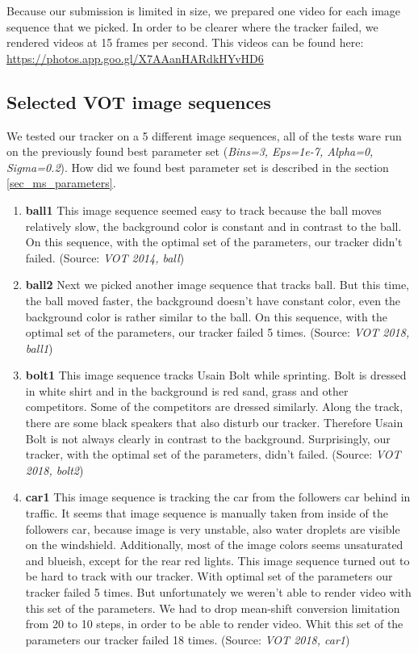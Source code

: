\documentclass[runningheads]{llncs}
\begin{document}
Because our submission is limited in size, we prepared one video for each image sequence that we picked. In order to be clearer where the tracker failed, we rendered videos at 15 frames per second. This videos can be found here: \url{https://photos.app.goo.gl/X7AAanHARdkHYvHD6}

\subsection{Selected VOT image sequences}

We tested our tracker on a 5 different image sequences, all of the tests ware run on the previously found best parameter set (\textit{Bins=3, Eps=1e-7, Alpha=0, Sigma=0.2}). How did we found best parameter set is described in the section \ref{sec_ms_parameters}.
\begin{enumerate}
\item \textbf{ball1} This image sequence seemed easy to track because the ball moves relatively slow, the background color is constant and in contrast to the ball. On this sequence, with the optimal set of the parameters, our tracker didn't failed. (Source: \textit{VOT 2014, ball})
\item \textbf{ball2} Next we picked another image sequence that tracks ball. But this time, the ball moved faster, the background doesn't have constant color, even the background color is rather similar to the ball. On this sequence, with the optimal set of the parameters, our tracker failed 5 times. (Source: \textit{VOT 2018, ball1})
\item \textbf{bolt1} This image sequence tracks Usain Bolt while sprinting. Bolt is dressed in white shirt and in the background is red sand, grass and other competitors. Some of the competitors are dressed similarly. Along the track, there are some black speakers that also disturb our tracker. Therefore Usain Bolt is not always clearly in contrast to the background. Surprisingly, our tracker, with the optimal set of the parameters, didn't failed. (Source: \textit{VOT 2018, bolt2})
\item \textbf{car1} This image sequence is tracking the car from the followers car behind in traffic. It seems that image sequence is manually taken from inside of the followers car, because image is very unstable, also water droplets are visible on the windshield. Additionally, most of the image colors seems unsaturated and blueish, except for the rear red lights. This image sequence turned out to be hard to track with our tracker. With optimal set of the parameters our tracker failed 5 times. But unfortunately we weren't able to render video with this set of the parameters. We had to drop mean-shift conversion limitation from 20 to 10 steps, in order to be able to render video. Whit this set of the parameters our tracker failed 18 times. (Source: \textit{VOT 2018, car1})

\end{enumerate}
\end{document}
